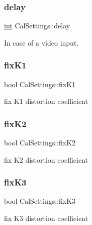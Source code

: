 \mbox{\label{class_cal_settings_abefb1d66ea3a38cdc937ab0647643479}} 
\subsubsection{\texorpdfstring{delay}{delay}}
{\footnotesize\ttfamily \mbox{\hyperlink{draw_8hh_aa620a13339ac3a1177c86edc549fda9b}{int}} Cal\+Settings\+::delay}



In case of a video input. 

\mbox{\label{class_cal_settings_a062c6f2dcf6356c1260a7dfbfae4488a}} 
\subsubsection{\texorpdfstring{fixK1}{fixK1}}
{\footnotesize\ttfamily bool Cal\+Settings\+::fix\+K1}



fix K1 distortion coefficient 

\mbox{\label{class_cal_settings_af4cc9513c1717b53bf7112197e185784}} 
\subsubsection{\texorpdfstring{fixK2}{fixK2}}
{\footnotesize\ttfamily bool Cal\+Settings\+::fix\+K2}



fix K2 distortion coefficient 

\mbox{\label{class_cal_settings_ad5b43b38acd876e10dda7525c235034e}} 
\subsubsection{\texorpdfstring{fixK3}{fixK3}}
{\footnotesize\ttfamily bool Cal\+Settings\+::fix\+K3}



fix K3 distortion coefficient 

